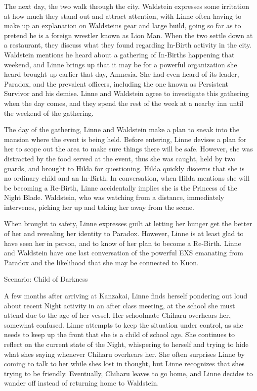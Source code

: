 \begin{tcolorbox}[breakable, colback=white, colframe=black!80,
  boxrule=0.6pt, arc=0mm, left=3mm, right=3mm, top=2mm, bottom=2mm]
The next day, the two walk through the city. Waldstein expresses some irritation at how much they stand out and attract attention, with Linne often having to make up an explanation on Waldstein\textquotesingle{}s gear and large build, going so far as to pretend he is a foreign wrestler known as \textquotedbl{}Lion Man\textquotedbl{}. When the two settle down at a restaurant, they discuss what they found regarding In-{}Birth activity in the city. Waldstein mentions he heard about a gathering of In-{}Births happening that weekend, and Linne brings up that it may be for a powerful organization she heard brought up earlier that day, Amnesia. She had even heard of its leader, Paradox, and the prevalent officers, including the one known as Persistent Survivor and his demise. Linne and Waldstein agree to investigate this gathering when the day comes, and they spend the rest of the week at a nearby inn until the weekend of the gathering.\par
\medskip
The day of the gathering, Linne and Waldstein make a plan to sneak into the mansion where the event is being held. Before entering, Linne devises a plan for her to scope out the area to make sure things there will be safe. However, she was distracted by the food served at the event, thus she was caught, held by two guards, and brought to Hilda for questioning. Hilda quickly discerns that she is no ordinary child and an In-{}Birth. In conversation, when Hilda mentions she will be becoming a Re-{}Birth, Linne accidentally implies she is the Princess of the Night Blade. Waldstein, who was watching from a distance, immediately intervenes, picking her up and taking her away from the scene.\par
\medskip
When brought to safety, Linne expresses guilt at letting her hunger get the better of her and revealing her identity to Paradox. However, Linne is at least glad to have seen her in person, and to know of her plan to become a Re-{}Birth. Linne and Waldstein have one last conversation of the powerful EXS emanating from Paradox and the likelihood that she may be connected to Kuon.\par
\medskip
Scenario: Child of Darkness\par
A few months after arriving at Kanzakai, Linne finds herself pondering out loud about recent Night activity in an after class meeting, at the school she must attend due to the age of her vessel. Her schoolmate Chiharu overhears her, somewhat confused. Linne attempts to keep the situation under control, as she needs to keep up the front that she is a child of school age. She continues to reflect on the current state of the Night, whispering to herself and trying to hide what she\textquotesingle{}s saying whenever Chiharu overhears her. She often surprises Linne by coming to talk to her while she\textquotesingle{}s lost in thought, but Linne recognizes that she\textquotesingle{}s trying to be friendly. Eventually, Chiharu leaves to go home, and Linne decides to wander off instead of returning home to Waldstein.\par

\end{tcolorbox}
